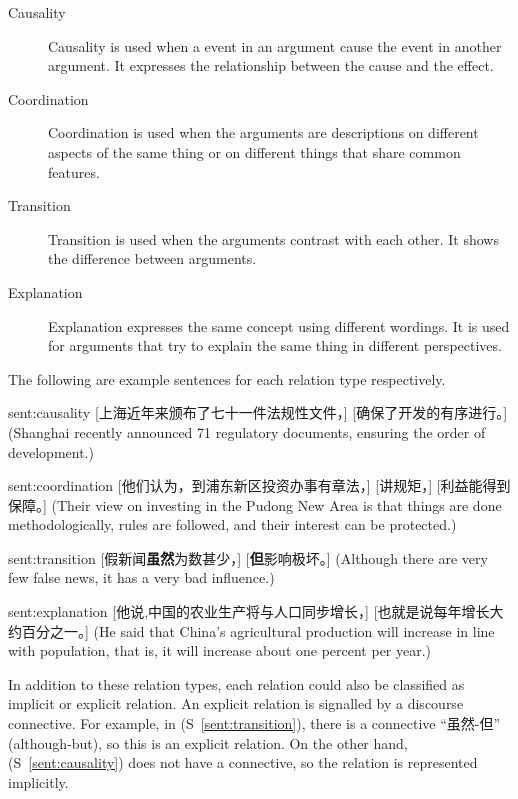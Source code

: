 \begin{description}
\item[Causality] Causality is used when a event in an argument cause the event
    in another argument. It expresses the relationship between the cause
    and the effect.
\item[Coordination] Coordination is used when the arguments are
    descriptions on different aspects of the same thing or
    on different things that share common features.
\item[Transition] Transition is used when the arguments contrast with each other.
    It shows the difference between arguments.
\item[Explanation] Explanation expresses the same concept using different wordings.
    It is used for arguments that try to explain the same thing in different perspectives.
\end{description}

The following are example sentences for each relation type respectively.

\begin{sent}{sent:causality}{}
    [上海近年来颁布了七十一件法规性文件，] [确保了开发的有序进行。]
    (Shanghai recently announced 71 regulatory documents, ensuring the order of development.)
\end{sent}

\begin{sent}{sent:coordination}{}
    [他们认为，到浦东新区投资办事有章法，] [讲规矩，] [利益能得到保障。]
    (Their view on investing in the Pudong New Area is that things are done methodologically,
    rules are followed, and their interest can be protected.)
\end{sent}

\begin{sent}{sent:transition}{}
    [假新闻\textbf{虽然}为数甚少，] [\textbf{但}影响极坏。]
    (Although there are very few false news, it has a very bad influence.)
\end{sent}

\begin{sent}{sent:explanation}{}
    [他说,中国的农业生产将与人口同步增长，] [也就是说每年增长大约百分之一。]
    (He said that China's agricultural production will increase in line with
    population, that is, it will increase about one percent per year.)
\end{sent}

In addition to these relation types, each relation could also be classified as implicit
or explicit relation. An explicit relation is signalled by a discourse connective. For
example, in (S~\ref{sent:transition}), there is a connective ``虽然-但'' (although-but),
so this is an explicit relation. On the other hand, (S~\ref{sent:causality}) does not
have a connective, so the relation is represented implicitly.

